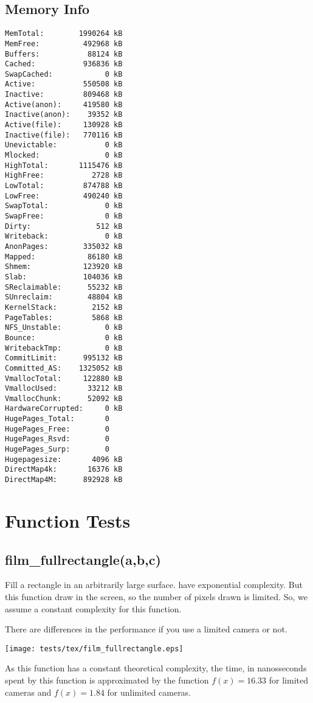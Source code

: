 \documentclass{article}
\begin{document}
\subsection{Memory Info}
\begin{verbatim}
MemTotal:        1990264 kB
MemFree:          492968 kB
Buffers:           88124 kB
Cached:           936836 kB
SwapCached:            0 kB
Active:           550508 kB
Inactive:         809468 kB
Active(anon):     419580 kB
Inactive(anon):    39352 kB
Active(file):     130928 kB
Inactive(file):   770116 kB
Unevictable:           0 kB
Mlocked:               0 kB
HighTotal:       1115476 kB
HighFree:           2728 kB
LowTotal:         874788 kB
LowFree:          490240 kB
SwapTotal:             0 kB
SwapFree:              0 kB
Dirty:               512 kB
Writeback:             0 kB
AnonPages:        335032 kB
Mapped:            86180 kB
Shmem:            123920 kB
Slab:             104036 kB
SReclaimable:      55232 kB
SUnreclaim:        48804 kB
KernelStack:        2152 kB
PageTables:         5868 kB
NFS_Unstable:          0 kB
Bounce:                0 kB
WritebackTmp:          0 kB
CommitLimit:      995132 kB
Committed_AS:    1325052 kB
VmallocTotal:     122880 kB
VmallocUsed:       33212 kB
VmallocChunk:      52092 kB
HardwareCorrupted:     0 kB
HugePages_Total:       0
HugePages_Free:        0
HugePages_Rsvd:        0
HugePages_Surp:        0
Hugepagesize:       4096 kB
DirectMap4k:       16376 kB
DirectMap4M:      892928 kB
\end{verbatim}
\section{Function Tests}
\subsection{film\_fullrectangle(a,b,c)}
Fill a rectangle in an arbitrarily large surface.
have exponential complexity. But this function
draw in the screen, so the number of pixels drawn
is limited. So, we assume a constant complexity
for this function.

There are differences in the performance if you use
a limited camera or not.

\texttt{[image: tests/tex/film\_fullrectangle.eps]}

As this function has a constant
theoretical complexity, the time, in nanosseconds
spent by this function is 
approximated by the function $f(x)=16.33$
for limited cameras and $f(x)=1.84$ for
unlimited cameras.
\end{document}
